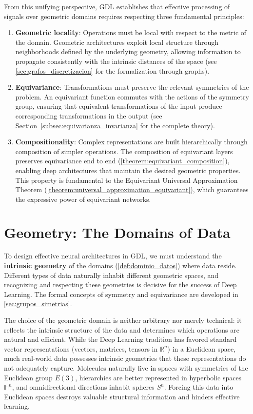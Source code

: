 From this unifying perspective, \gls{GDL} establishes that effective processing of signals over geometric domains requires respecting three fundamental principles:

\begin{enumerate}
    \item \textbf{Geometric locality}: Operations must be local with respect to the metric of the domain. Geometric architectures exploit local structure through neighborhoods defined by the underlying geometry, allowing information to propagate consistently with the intrinsic distances of the space (see \autoref{sec:grafos_discretizacion} for the formalization through graphs).

    \item \textbf{Equivariance}: Transformations must preserve the relevant symmetries of the problem. An equivariant function commutes with the actions of the symmetry group, ensuring that equivalent transformations of the input produce corresponding transformations in the output (see Section~\ref{subsec:equivarianza_invarianza} for the complete theory).

    \item \textbf{Compositionality}: Complex representations are built hierarchically through composition of simpler operations. The composition of equivariant layers preserves equivariance end to end (\autoref{theorem:equivariant_composition}), enabling deep architectures that maintain the desired geometric properties. This property is fundamental to the Equivariant Universal Approximation Theorem (\autoref{theorem:universal_approximation_equivariant}), which guarantees the expressive power of equivariant networks.
\end{enumerate}

\section{Geometry: The Domains of Data}\label{sec:geometria_dominios}

To design effective neural architectures in \gls{GDL}, we must understand the \textbf{intrinsic geometry} of the domains (\autoref{def:dominio_datos}) where data reside. Different types of data naturally inhabit different geometric spaces, and recognizing and respecting these geometries is decisive for the success of Deep Learning. The formal concepts of symmetry and equivariance are developed in \autoref{sec:grupos_simetrias}.

The choice of the geometric domain is neither arbitrary nor merely technical: it reflects the intrinsic structure of the data and determines which operations are natural and efficient. While the Deep Learning tradition has favored standard vector representations (vectors, matrices, tensors in $\mathbb{R}^n$) in a Euclidean space, much real-world data possesses intrinsic geometries that these representations do not adequately capture. Molecules naturally live in spaces with symmetries of the Euclidean group $E(3)$, hierarchies are better represented in hyperbolic spaces $\mathbb{H}^n$, and omnidirectional directions inhabit spheres $S^n$. Forcing this data into Euclidean spaces destroys valuable structural information and hinders effective learning.

